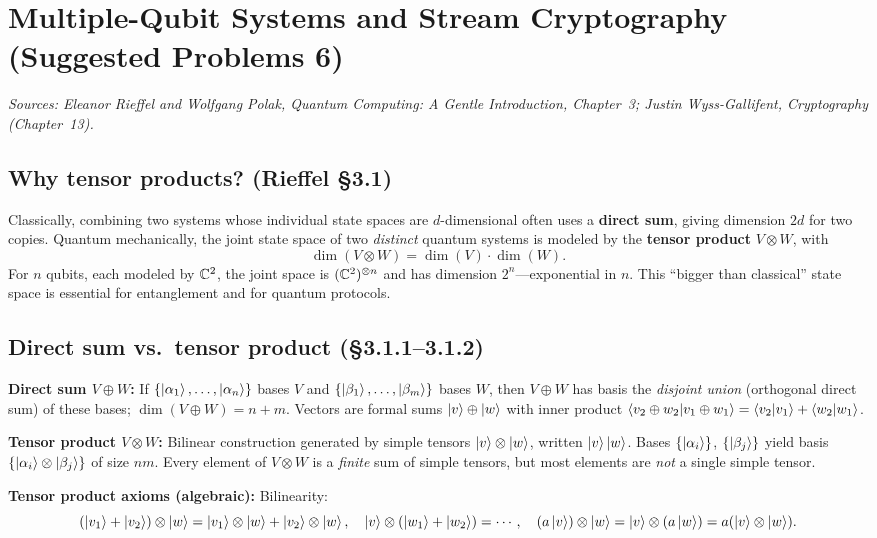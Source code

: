 \chapter{Multiple-Qubit Systems and Stream Cryptography (Suggested Problems 6)}

\noindent\textit{Sources: Eleanor Rieffel and Wolfgang Polak, \textit{Quantum Computing: A Gentle Introduction}, Chapter~3; Justin Wyss-Gallifent, \textit{Cryptography} (Chapter~13).}

\section{Why tensor products? (Rieffel \S3.1)}

Classically, combining two systems whose individual state spaces are $d$-dimensional often uses a \textbf{direct sum}, giving dimension $2d$ for two copies. Quantum mechanically, the joint state space of two \emph{distinct} quantum systems is modeled by the \textbf{tensor product} $V\otimes W$, with
\[
\dim(V\otimes W)=\dim(V)\cdot\dim(W).
\]
For $n$ qubits, each modeled by $\mathbb{C}^2$, the joint space is $(\mathbb{C}^2)^{\otimes n}$ and has dimension $2^n$---exponential in $n$. This ``bigger than classical'' state space is essential for entanglement and for quantum protocols.

\section{Direct sum vs.\ tensor product (\S3.1.1--3.1.2)}

\textbf{Direct sum $V\oplus W$:} If $\{\left|\alpha_1\right\rangle,\ldots,\left|\alpha_n\right\rangle\}$ bases $V$ and $\{\left|\beta_1\right\rangle,\ldots,\left|\beta_m\right\rangle\}$ bases $W$, then $V\oplus W$ has basis the \emph{disjoint union} (orthogonal direct sum) of these bases; $\dim(V\oplus W)=n+m$. Vectors are formal sums $\left|v\right\rangle\oplus\left|w\right\rangle$ with inner product $\left\langle v_2\oplus w_2\middle|v_1\oplus w_1\right\rangle=\left\langle v_2\middle|v_1\right\rangle+\left\langle w_2\middle|w_1\right\rangle$.

\textbf{Tensor product $V\otimes W$:} Bilinear construction generated by simple tensors $\left|v\right\rangle\otimes\left|w\right\rangle$, written $\left|v\right\rangle\left|w\right\rangle$. Bases $\{\left|\alpha_i\right\rangle\}$, $\{\left|\beta_j\right\rangle\}$ yield basis $\{\left|\alpha_i\right\rangle\otimes\left|\beta_j\right\rangle\}$ of size $nm$. Every element of $V\otimes W$ is a \emph{finite} sum of simple tensors, but most elements are \emph{not} a single simple tensor.

\textbf{Tensor product axioms (algebraic):} Bilinearity:
\[
(\left|v_1\right\rangle+\left|v_2\right\rangle)\otimes\left|w\right\rangle=\left|v_1\right\rangle\otimes\left|w\right\rangle+\left|v_2\right\rangle\otimes\left|w\right\rangle,\quad
\left|v\right\rangle\otimes(\left|w_1\right\rangle+\left|w_2\right\rangle)=\cdots,\quad
(a\left|v\right\rangle)\otimes\left|w\right\rangle=\left|v\right\rangle\otimes(a\left|w\right\rangle)=a(\left|v\right\rangle\otimes\left|w\right\rangle).
\]

